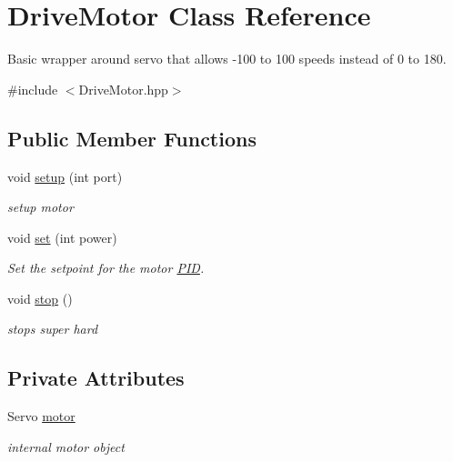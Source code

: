 \hypertarget{classDriveMotor}{\section{Drive\-Motor Class Reference}
\label{classDriveMotor}
}


Basic wrapper around servo that allows -\/100 to 100 speeds instead of 0 to 180.  




{\ttfamily \#include $<$Drive\-Motor.\-hpp$>$}

\subsection*{Public Member Functions}
\begin{DoxyCompactItemize}
\item 
void \hyperlink{classDriveMotor_aac017793d1fc4a5b0c75d6f1bc507230}{setup} (int port)
\begin{DoxyCompactList}\small\item\em setup motor \end{DoxyCompactList}\item 
void \hyperlink{classDriveMotor_a616b2eb611ddc4862d2d52103bb7aadc}{set} (int power)
\begin{DoxyCompactList}\small\item\em Set the setpoint for the motor \hyperlink{classPID}{P\-I\-D}. \end{DoxyCompactList}\item 
void \hyperlink{classDriveMotor_af40ee6f659e9512e2af2c8e7df07218e}{stop} ()
\begin{DoxyCompactList}\small\item\em stops super hard \end{DoxyCompactList}\end{DoxyCompactItemize}
\subsection*{Private Attributes}
\begin{DoxyCompactItemize}
\item 
Servo \hyperlink{classDriveMotor_a27de76439b7bd1035b17faf78be59478}{motor}
\begin{DoxyCompactList}\small\item\em internal motor object \end{DoxyCompactList}\end{DoxyCompactItemize}


